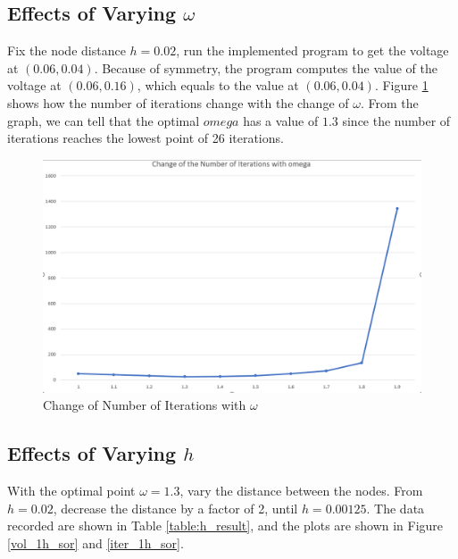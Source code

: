 \documentclass[a4paper,titlepage]{article}
\begin{document}
		\subsection{Effects of Varying $\omega$}
			Fix the node distance $h = 0.02$, run the implemented program to get the voltage at $(0.06, 0.04)$. Because of symmetry, the program computes the value of the voltage at $(0.06, 0.16)$, which equals to the value at $(0.06, 0.04)$. Figure \ref{iteration_omega} shows how the number of iterations change with the change of $\omega$. From the graph, we can tell that the optimal $omega$ has a value of $1.3$ since the number of iterations reaches the lowest point of 26 iterations.
			\begin{figure}[!h]
				\centering
				\includegraphics[width=\linewidth]{iteration_omega}
				\caption{Change of Number of Iterations with $\omega$}
				\label{iteration_omega}
			\end{figure}
		\subsection{Effects of Varying $h$}
			With the optimal point $\omega = 1.3$, vary the distance between the nodes. From $h = 0.02$, decrease the distance by a factor of 2, until $h = 0.00125$. The data recorded are shown in Table \ref{table:h_result}, and the plots are shown in Figure \ref{vol_1h_sor} and \ref{iter_1h_sor}.
			
\end{document}
